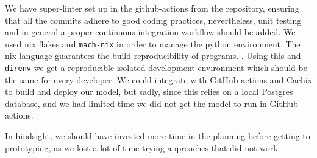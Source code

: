 We have super-linter set up in the github-actions from the repository, ensuring that all
the commits adhere to good coding practices,
nevertheless, unit testing and in general a proper continuous integration workflow should be added.
We used nix flakes and \texttt{mach-nix}\cite{davhau_mach-nix_2022} in order to manage the python environment. The nix language guarantees the build reproducibility of programs.
\cite{noauthor_nix_nodate,dolstra_purely_2006,noauthor_nixos_nodate,noauthor_nix_2021}.
Using this and \texttt{direnv} \cite{noauthor_direnv_nodate} we get a reproducible isolated development environment which should be the same for every developer.
We could integrate
with GitHub actions and Cachix to build and deploy our model, but sadly, since this relies on a local Postgres database, and we had limited time we did not get the model to run in GitHub actions.

In hindsight, we should have invested more time in the planning before getting to prototyping, as we lost
a lot of time trying approaches that did not work.
